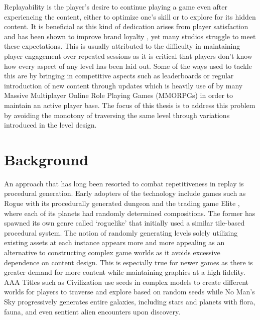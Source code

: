 \documentclass{Configuration_Files/PoliMi3i_thesis}
\begin{document}
Replayability is the player’s desire to continue playing a game even after 
experiencing the content, either to optimize one’s skill or to explore for its hidden 
content. It is beneficial as this kind of dedication arises from player satisfaction and 
has been shown to improve brand loyalty \cite{TiF11}, yet many studios struggle to meet these 
expectations. This is usually attributed to the difficulty in maintaining player 
engagement over repeated sessions as it is critical that players don't know how every 
aspect of any level has been laid out. Some of the ways used to tackle this are by 
bringing in competitive aspects such as leaderboards or regular introduction of new 
content through updates which is heavily use of by many Massive Multiplayer Online 
Role Playing Games (MMORPGs) in order to maintain an active player base. The focus of this 
thesis is to address this problem by avoiding the monotony of traversing the same level through 
variations introduced in the level design.
\newpage

\section{Background}
\label{sec:background}
An approach that has long been resorted to combat repetitiveness in replay is 
procedural generation. Early adopters of the technology include games such as 
Rogue \cite{MiT80} with its procedurally generated dungeon and the trading game Elite \cite{DaB84}, 
where each of its planets had randomly determined compositions. The former has 
spawned its own genre called ‘roguelike’ that initially used a similar tile-based 
procedural system. The notion of randomly generating levels solely utilizing existing 
assets at each instance appears more and more appealing as an alternative to 
constructing complex game worlds as it avoids excessive dependence on content 
design. This is especially true for newer games as there is greater demand for more 
content while maintaining graphics at a high fidelity. AAA Titles such as Civilization 
\cite{MiP96} use seeds in complex models to create different worlds for players to 
traverse and explore based on random seeds while No Man’s Sky \cite{HaG16} progressively 
generates entire galaxies, including stars and planets with flora, fauna, and even 
sentient alien encounters upon discovery.
\end{document}
